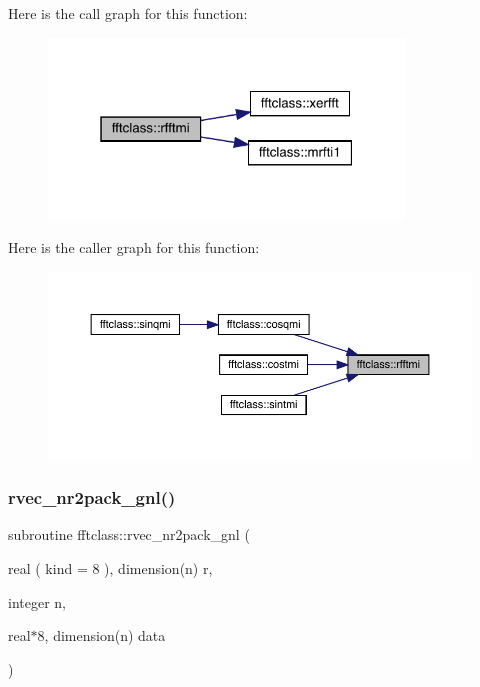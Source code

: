 Here is the call graph for this function\+:\nopagebreak
\begin{figure}[H]
\begin{center}
\leavevmode
\includegraphics[width=268pt]{namespacefftclass_a6a543283f910322f94293d719f923881_cgraph}
\end{center}
\end{figure}
Here is the caller graph for this function\+:\nopagebreak
\begin{figure}[H]
\begin{center}
\leavevmode
\includegraphics[width=350pt]{namespacefftclass_a6a543283f910322f94293d719f923881_icgraph}
\end{center}
\end{figure}
\mbox{\label{namespacefftclass_a2c47e8aa546c8ea9f5f23219be52d57e}} 
\subsubsection{\texorpdfstring{rvec\_nr2pack\_gnl()}{rvec\_nr2pack\_gnl()}}
{\footnotesize\ttfamily subroutine fftclass\+::rvec\+\_\+nr2pack\+\_\+gnl (\begin{DoxyParamCaption}\item[{real ( kind = 8 ), dimension(n)}]{r,  }\item[{integer}]{n,  }\item[{real$\ast$8, dimension(n)}]{data }\end{DoxyParamCaption})}

